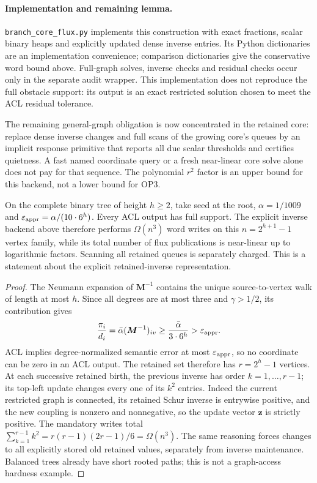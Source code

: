 \paragraph{Implementation and remaining lemma.}
\texttt{branch\_core\_flux.py} implements this construction with exact
fractions, scalar binary heaps and explicitly updated dense inverse entries.
Its Python dictionaries are an implementation convenience; comparison
dictionaries give the conservative word bound above. Full-graph solves,
inverse checks and residual checks occur only in the separate audit wrapper.
This implementation does not reproduce the full obstacle support: its output
is an exact restricted solution chosen to meet the ACL residual tolerance.

The remaining general-graph obligation is now concentrated in the retained
core: replace dense inverse changes and full scans of the growing core's
queues by an implicit response primitive that reports all due scalar
thresholds and certifies quietness. A fast named coordinate query or a fresh
near-linear core solve alone does not pay for that sequence. The polynomial
$r^2$ factor is an upper bound for this backend, not a lower bound for OP3.

\begin{proposition}
\label{prop:op3-dense-core-binary-tree}
On the complete binary tree of height $h\geq2$, take seed at the root,
$\alpha=1/1009$ and $\varepsilon_{\mathrm{appr}}=\alpha/(10\cdot6^h)$.
Every ACL output has full support. The explicit inverse backend above
therefore performs $\Omega(n^3)$ word writes on this $n=2^{h+1}-1$ vertex
family, while its total number of flux publications is near-linear up to
logarithmic factors. Scanning all retained queues is separately charged.
This is a statement about the explicit retained-inverse representation.
\end{proposition}
\begin{proof}
The Neumann expansion of $\bm M^{-1}$ contains the unique source-to-vertex
walk of length at most $h$. Since all degrees are at most three and
$\gamma>1/2$, its contribution gives
\[
 \frac{\pi_i}{d_i}
 =\bar\alpha(\bm M^{-1})_{iv}
 \geq\frac{\bar\alpha}{3\cdot6^h}
 >\varepsilon_{\mathrm{appr}}.
\]
ACL implies degree-normalized semantic error at most $\varepsilon_{\mathrm{appr}}$, so no
coordinate can be zero in an ACL output. The retained set therefore has
$r=2^h-1$ vertices. At each successive retained birth, the previous inverse
has order $k=1,\ldots,r-1$; its top-left update changes every one of its
$k^2$ entries. Indeed the current restricted graph is connected, its
retained Schur inverse is entrywise positive, and the new coupling is
nonzero and nonnegative, so the update vector $\bm z$ is strictly positive.
The mandatory writes total
$\sum_{k=1}^{r-1}k^2=r(r-1)(2r-1)/6=\Omega(n^3)$.
The same reasoning forces changes to all explicitly stored old retained
values, separately from inverse maintenance. Balanced trees already have
short rooted paths; this is not a graph-access hardness example.
\end{proof}
